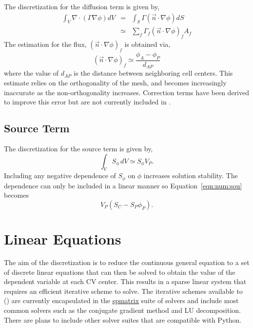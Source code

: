 The discretization for the diffusion term is given by,
\begin{eqnarray}
\int_V \nabla \cdot (\Gamma\nabla\phi) dV & = & \int_S \Gamma (\vec{n} \cdot \nabla\phi) dS \\
& \simeq & \sum_f \Gamma_f (\vec{n} \cdot \nabla\phi)_f A_f
\label{eqn:num:dif}
\end{eqnarray}
The estimation for the flux, $(\vec{n} \cdot \nabla\phi)_f$ is obtained via,
\begin{equation}
(\vec{n} \cdot \nabla\phi)_f \simeq \frac{\phi_A-\phi_P}{d_{AP}}
\end{equation}
where the value of $d_{AP}$ is the distance between neighboring cell
centers.  This estimate relies on the orthogonality of the mesh, and
becomes increasingly inaccurate as the non-orthogonality increases.
Correction terms have been derived to improve this error but are not
currently included in \FiPy{}.

\subsection{Source Term}

The discretization for the source term is given by, 
\begin{equation}
\int_V S_{\phi}\,dV \simeq S_\phi V_P.
\label{eqn:num:sou}
\end{equation}
Including any negative dependence of $S_\phi$ on $\phi$ increases
solution stability. The dependence can only be included in a linear
manner so Equation~\eqref{eqn:num:sou} becomes
\begin{equation}
V_P (S_C - S_P \phi_P).
\end{equation}

\section{Linear Equations}

The aim of the discretization is to reduce the continuous general
equation to a set of discrete linear equations that can then be solved
to obtain the value of the dependent variable at each CV center. This
results in a sparse linear system that requires an efficient iterative
scheme to solve. The iterative schemes available to \FiPy() are
currently encapsulated in the \href{#id5}{spmatrix} suite of solvers
and include most common solvers such as the conjugate gradient method
and LU decomposition. There are plans to include other solver suites
that are compatible with Python.


